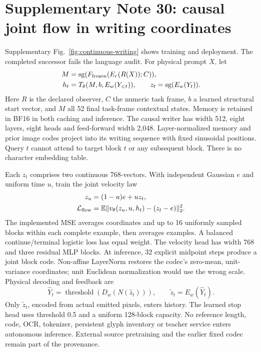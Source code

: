 \documentclass[10pt,a4paper]{article}
\begin{document}
\section*{Supplementary Note 30: causal joint flow in writing coordinates}
Supplementary Fig.~\ref{fig:continuous-writing} shows training and deployment.
The completed successor fails the language audit. For physical prompt $X$, let
\begin{align}
 M &= \operatorname{sg}(F_{\rm frozen}(E_r(R(X));C)),\\
 h_t &= T_\theta(M,b,E_w(Y_{<t})),\qquad z_t=\operatorname{sg}(E_w(Y_t)).
\end{align}
Here $R$ is the declared observer, $C$ the numeric task frame, $b$ a learned
structural start vector, and $M$ all 52 final task-frame contextual states.
Memory is retained in BF16 in both caching and inference. The causal writer
has width 512, eight layers, eight heads and feed-forward width 2,048.
Layer-normalized memory and prior image codes project into its writing
sequence with fixed sinusoidal positions. Query $t$ cannot attend to target
block $t$ or any subsequent block. There is no character embedding table.

Each $z_t$ comprises two continuous 768-vectors. With independent Gaussian
$e$ and uniform time $u$, train the joint velocity law
\begin{align}
 z_u&=(1-u)e+uz_t,\\
 \mathcal L_{\rm flow}&=\mathbb E\|v_\theta(z_u,u,h_t)-(z_t-e)\|_2^2.
\end{align}
The implemented MSE averages coordinates and up to 16 uniformly sampled
blocks within each complete example, then averages examples. A balanced
continue/terminal logistic loss has equal weight. The velocity head has width
768 and three residual MLP blocks. At inference, 32 explicit midpoint steps
produce a joint block code. Non-affine LayerNorm restores the codec's
zero-mean, unit-variance coordinates; unit Euclidean normalization would use
the wrong scale. Physical decoding and feedback are
\begin{equation}
 \widehat Y_t=\operatorname{threshold}(D_w(N(\widehat z_t))),
 \qquad \widetilde z_t=E_w(\widehat Y_t).
\end{equation}
Only $\widetilde z_t$, encoded from actual emitted pixels, enters history.
The learned stop head uses threshold 0.5 and a uniform 128-block capacity.
No reference length, code, OCR, tokenizer, persistent glyph inventory or
teacher service enters autonomous inference. External source pretraining and
the earlier fixed codec remain part of the provenance.
\end{document}
